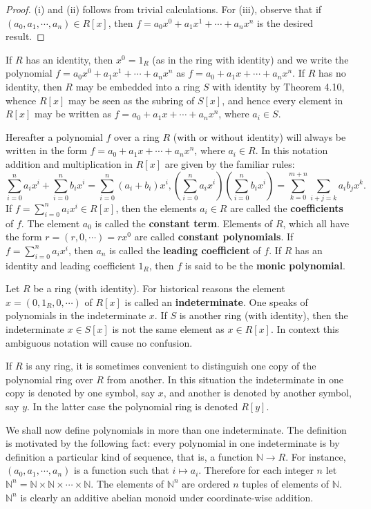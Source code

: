 \begin{proof}
(i) and (ii) follows from trivial calculations. For (iii), observe that if $(a_0,a_1,\cdots,a_n)\in R[x]$, then $f=a_0x^0+a_1x^1+\cdots+a_nx^n$ is the desired result.
\end{proof}
If $R$ has an identity, then $x^0=1_R$ (as in the ring with identity) and we write the polynomial $f=a_0x^0+a_1x^1+\cdots+a_nx^n$ as $f=a_0+a_1x+\cdots+a_nx^n$. If $R$ has no identity, then $R$ may be embedded into a ring $S$ with identity by Theorem 4.10, whence $R[x]$ may be seen as the subring of $S[x]$, and hence every element in $R[x]$ may be written as $f=a_0+a_1x+\cdots+a_nx^n$, where $a_i\in S$.\par
Hereafter a polynomial $f$ over a ring $R$ (with or without identity) will always be written in the form $f=a_0+a_1x+\cdots+a_nx^n$, where $a_i\in R$. In this notation addition and multiplication in $R[x]$ are given by the familiar rules: 
$$
\sum_{i=0}^n{a_ix^i}+\sum_{i=0}^n{b_ix^i}=\sum_{i=0}^n{\left( a_i+b_i \right) x^i},\left( \sum_{i=0}^n{a_ix^i} \right) \left( \sum_{i=0}^n{b_ix^i} \right) =\sum_{k=0}^{m+n}{\sum_{i+j=k}{a_ib_jx^k}}.
$$
If $f=\sum_{i=0}^na_ix^i\in R[x]$, then the elements $a_i\in R$ are called the \textbf{coefficients} of $f$. The element $a_0$ is called the \textbf{constant term}. Elements of $R$, which all have the form $r=(r,0,\cdots)=rx^0$ are called \textbf{constant polynomials}. If $f=\sum_{i=0}^na_ix^i$, then $a_n$ is called the \textbf{leading coefficient} of $f$. If $R$ has an identity and leading coefficient $1_R$, then $f$ is said to be the \textbf{monic polynomial}.\par
Let $R$ be a ring (with identity). For historical reasons the element $x=(0,1_R,0,\cdots)$ of $R[x]$ is called an \textbf{indeterminate}. One speaks of polynomials in the indeterminate $x$. If $S$ is another ring (with identity), then the indeterminate $x\in S[x]$ is not the same element as $x\in R[x]$. In context this ambiguous notation will cause no confusion.\par
If $R$ is any ring, it is sometimes convenient to distinguish one copy of the polynomial ring over $R$ from another. In this situation the indeterminate in one copy is denoted by one symbol, say $x$, and another is denoted by another symbol, say $y$. In the latter case the polynomial ring is denoted $R[y]$.\par
We shall now define polynomials in more than one indeterminate. The definition is motivated by the following fact: every polynomial in one indeterminate is by definition a particular kind of sequence, that is, a function $\mathbb{N}\to R$. For instance, $(a_0,a_1,\cdots,a_n)$ is a function such that $i\mapsto a_i$. Therefore for each integer $n$ let $\mathbb{N}^n=\mathbb{N}\times\mathbb{N}\times\cdots\times\mathbb{N}$. The elements of $\mathbb{N}^n$ are ordered $n$ tuples of elements of $\mathbb{N}$. $\mathbb{N}^n$ is clearly an additive abelian monoid under coordinate-wise addition.
